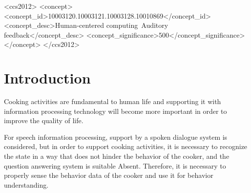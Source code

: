 \documentclass[sigchi]{acmart}
\begin{document}
%
%
\begin{CCSXML}
<ccs2012>
<concept>
<concept_id>10003120.10003121.10003128.10010869</concept_id>
<concept_desc>Human-centered computing~Auditory feedback</concept_desc>
<concept_significance>500</concept_significance>
</concept>
</ccs2012>
\end{CCSXML}


%

%

%
\maketitle

\section{Introduction}
Cooking activities are fundamental to human life and supporting it with information processing technology will become more important in order to improve the quality of life\cite{Uriu2012}.

For speech information processing, support by a spoken dialogue system is considered, but in order to support cooking activities, it is necessary to recognize the state in a way that does not hinder the behavior of the cooker, and the question answering system is suitable Absent. Therefore, it is necessary to properly sense the behavior data of the cooker and use it for behavior understanding.
\end{document}
